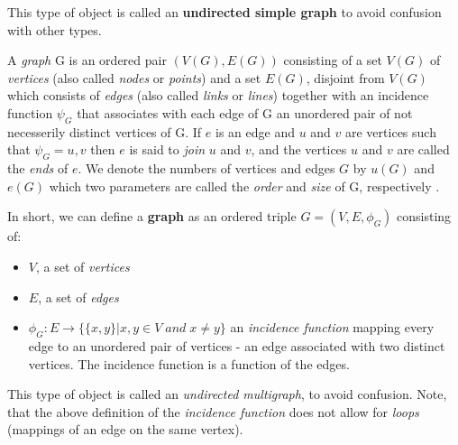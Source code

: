 This type of object is called an \textbf{undirected simple graph} to avoid confusion
with other types.

\begin{definition}\label{graph_def}
  A \textit{graph} G is an ordered pair $(V(G), E(G))$ consisting of a set
$V(G)$ of \textit{vertices} (also called \textit{nodes} or \textit{points}) and a set
$E(G)$, disjoint from $V(G)$ which consists of \textit{edges} (also called \textit{links}
or \textit{lines}) together with an incidence function $\psi_G$ that associates with each
edge of G an unordered pair of not necesserily distinct vertices of G.  If $e$ is an edge
and $u$ and $v$ are vertices such that $\psi_G ={u, v}$ then $e$ is said to \textit{join}
$u$ and $v$, and the vertices $u$ and $v$ are called the \textit{ends} of $e$. We denote
the numbers of vertices and edges $G$ by $u(G)$ and $e(G)$ which two parameters are called
the \textit{order} and \textit{size} of G, respectively \cite{book:2008}.

  In short, we can define a \textbf{graph} as an ordered triple $G=(V, E, \phi_G)$
consisting of:
  \begin{itemize}
  \item $V$, a set of \textit{vertices}
  \item $E$, a set of \textit{edges}
  \item $\phi_G: E \rightarrow \{\{x, y\} | x, y \in V \; and \; x \neq y\}$ an
\textit{incidence function} mapping every edge to an unordered pair of vertices - an edge
associated with two distinct vertices. The incidence function is a function of the edges.
  \end{itemize} This type of object is called an \textit{undirected multigraph}, to avoid
confusion. Note, that the above definition of the \textit{incidence function} does not
allow for \textit{loops} (mappings of an edge on the same vertex).


\end{definition}
